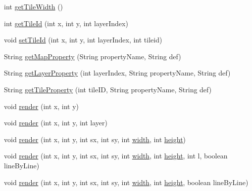 \begin{DoxyCompactItemize}
\item 
int \mbox{\hyperlink{classorg_1_1newdawn_1_1slick_1_1tiled_1_1_tiled_map_a44dd7389139c646e87d056fdd1e44232}{get\+Tile\+Width}} ()
\item 
int \mbox{\hyperlink{classorg_1_1newdawn_1_1slick_1_1tiled_1_1_tiled_map_a03f3fac591bac6a711f9b746a21da559}{get\+Tile\+Id}} (int x, int y, int layer\+Index)
\item 
void \mbox{\hyperlink{classorg_1_1newdawn_1_1slick_1_1tiled_1_1_tiled_map_a83940adc9a30f701eb793b8918f26d6b}{set\+Tile\+Id}} (int x, int y, int layer\+Index, int tileid)
\item 
String \mbox{\hyperlink{classorg_1_1newdawn_1_1slick_1_1tiled_1_1_tiled_map_a128392c0d3df060a45af99e04e1860d1}{get\+Map\+Property}} (String property\+Name, String def)
\item 
String \mbox{\hyperlink{classorg_1_1newdawn_1_1slick_1_1tiled_1_1_tiled_map_a3d0f5d0eab64ef750d18721530e3a43c}{get\+Layer\+Property}} (int layer\+Index, String property\+Name, String def)
\item 
String \mbox{\hyperlink{classorg_1_1newdawn_1_1slick_1_1tiled_1_1_tiled_map_aea96107a7e2b3c843771ae8c0f691368}{get\+Tile\+Property}} (int tile\+ID, String property\+Name, String def)
\item 
void \mbox{\hyperlink{classorg_1_1newdawn_1_1slick_1_1tiled_1_1_tiled_map_a313dd901616b31c772f213675d236389}{render}} (int x, int y)
\item 
void \mbox{\hyperlink{classorg_1_1newdawn_1_1slick_1_1tiled_1_1_tiled_map_a1348610840bcb4e3767b48050533b410}{render}} (int x, int y, int layer)
\item 
void \mbox{\hyperlink{classorg_1_1newdawn_1_1slick_1_1tiled_1_1_tiled_map_a2d681036859467cf77a235e0b082e6dc}{render}} (int x, int y, int sx, int sy, int \mbox{\hyperlink{classorg_1_1newdawn_1_1slick_1_1tiled_1_1_tiled_map_a13b00efd90dfee0ccc7474310e40199e}{width}}, int \mbox{\hyperlink{classorg_1_1newdawn_1_1slick_1_1tiled_1_1_tiled_map_a5f9af8e6eb820e35327c4290d14c0bd7}{height}})
\item 
void \mbox{\hyperlink{classorg_1_1newdawn_1_1slick_1_1tiled_1_1_tiled_map_a379329f5ea96f9fffcc9a55d18d32312}{render}} (int x, int y, int sx, int sy, int \mbox{\hyperlink{classorg_1_1newdawn_1_1slick_1_1tiled_1_1_tiled_map_a13b00efd90dfee0ccc7474310e40199e}{width}}, int \mbox{\hyperlink{classorg_1_1newdawn_1_1slick_1_1tiled_1_1_tiled_map_a5f9af8e6eb820e35327c4290d14c0bd7}{height}}, int l, boolean line\+By\+Line)
\item 
void \mbox{\hyperlink{classorg_1_1newdawn_1_1slick_1_1tiled_1_1_tiled_map_af25ff018d2ede1a3a57c27b6cb64e132}{render}} (int x, int y, int sx, int sy, int \mbox{\hyperlink{classorg_1_1newdawn_1_1slick_1_1tiled_1_1_tiled_map_a13b00efd90dfee0ccc7474310e40199e}{width}}, int \mbox{\hyperlink{classorg_1_1newdawn_1_1slick_1_1tiled_1_1_tiled_map_a5f9af8e6eb820e35327c4290d14c0bd7}{height}}, boolean line\+By\+Line)

\end{DoxyCompactItemize}
